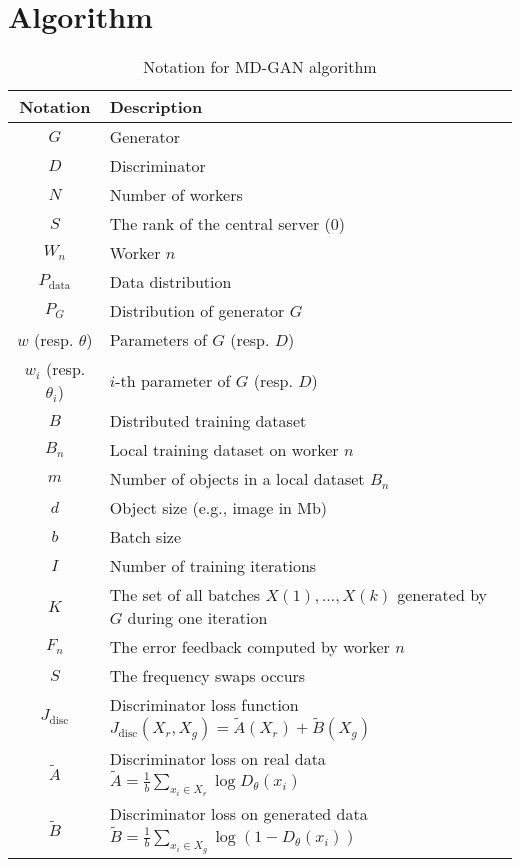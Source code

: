 \chapter{Algorithm} \label{appendix:algo}

\begin{table}[H]
    \centering
    \begin{tabular}{|c|m{10cm}|}
    \hline
    \textbf{Notation} & \textbf{Description} \\ \hline
    $G$ & Generator \\ \hline
    $D$ & Discriminator \\ \hline
    $N$ & Number of workers \\ \hline
    $S$ & The rank of the central server (0) \\ \hline
    $W_n$ & Worker $n$ \\ \hline
    $P_{\text{data}}$ & Data distribution \\ \hline
    $P_G$ & Distribution of generator $G$ \\ \hline
    $w$ (resp. $\theta$) & Parameters of $G$ (resp. $D$) \\ \hline
    $w_i$ (resp. $\theta_i$) & $i$-th parameter of $G$ (resp. $D$) \\ \hline
    $B$ & Distributed training dataset \\ \hline
    $B_n$ & Local training dataset on worker $n$ \\ \hline
    $m$ & Number of objects in a local dataset $B_n$ \\ \hline
    $d$ & Object size (e.g., image in Mb) \\ \hline
    $b$ & Batch size \\ \hline
    $I$ & Number of training iterations \\ \hline
    $K$ & The set of all batches $X(1), \dots, X(k)$ generated by $G$ during one iteration \\ \hline
    $F_n$ & The error feedback computed by worker $n$ \\ \hline
    $S$ & The frequency swaps occurs \\ \hline
    $J_{\text{disc}}$ & Discriminator loss function $J_{\text{disc}}(X_r, X_g) = \tilde{A}(X_r) + \tilde{B}(X_g)$ \\ \hline
    $\tilde{A}$ & Discriminator loss on real data $\tilde{A} = \frac{1}{b} \sum_{x_i \in X_r} \log D_{\theta}(x_i)$ \\ \hline
    $\tilde{B}$ & Discriminator loss on generated data $\tilde{B} = \frac{1}{b} \sum_{x_i \in X_g} \log (1 - D_{\theta}(x_i))$ \\ \hline
    \end{tabular}
    \caption{Notation for MD-GAN algorithm}
\end{table}

